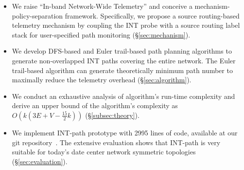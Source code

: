 \begin{itemize}

\item We raise ``In-band Network-Wide Telemetry'' and conceive a mechanism-policy-separation framework. Specifically, we propose a source routing-based telemetry mechanism by coupling the INT probe with a source routing label stack for user-specified path monitoring (\S\ref{sec:mechanism}).

\item We develop DFS-based and Euler trail-based path planning algorithms to generate non-overlapped INT paths covering the entire network. The Euler trail-based algorithm can generate theoretically minimum path number to maximally reduce the telemetry overhead (\S\ref{sec:algorithm}).

\item We conduct an exhaustive analysis of algorithm's run-time complexity and derive an upper bound of the algorithm's complexity as $O(k(3E + V -\frac{15}{2}k))$ (\S\ref{subsec:theory}).

\item We implement INT-path prototype with 2995 lines of code, available at our git repository~\cite{git}. The extensive evaluation shows that INT-path is very suitable for today's date center network symmetric topologies (\S\ref{sec:evaluation}).

\end{itemize}

